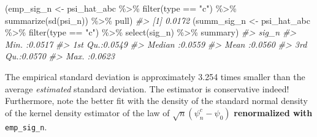 \documentclass[
  11pt,
  openright,twoside]{book}
\newenvironment{Shaded}{\begin{snugshade}}{\end{snugshade}}
\newcommand{\CommentTok}[1]{\textcolor[rgb]{0.56,0.35,0.01}{\textit{#1}}}
\newcommand{\FunctionTok}[1]{\textcolor[rgb]{0.00,0.00,0.00}{#1}}
\newcommand{\NormalTok}[1]{#1}
\newcommand{\OtherTok}[1]{\textcolor[rgb]{0.56,0.35,0.01}{#1}}
\newcommand{\SpecialCharTok}[1]{\textcolor[rgb]{0.00,0.00,0.00}{#1}}
\newcommand{\StringTok}[1]{\textcolor[rgb]{0.31,0.60,0.02}{#1}}
\theoremstyle{definition}
\theoremstyle{definition}
\theoremstyle{definition}
\theoremstyle{definition}
\theoremstyle{remark}
\begin{document}
\begin{Shaded}
\begin{Highlighting}[]
\NormalTok{(emp\_sig\_n }\OtherTok{\textless{}{-}}\NormalTok{ psi\_hat\_abc }\SpecialCharTok{\%\textgreater{}\%} \FunctionTok{filter}\NormalTok{(type }\SpecialCharTok{==} \StringTok{"c"}\NormalTok{) }\SpecialCharTok{\%\textgreater{}\%}
   \FunctionTok{summarize}\NormalTok{(}\FunctionTok{sd}\NormalTok{(psi\_n)) }\SpecialCharTok{\%\textgreater{}\%}\NormalTok{ pull)}
\CommentTok{\#\textgreater{} [1] 0.0172}
\NormalTok{(summ\_sig\_n }\OtherTok{\textless{}{-}}\NormalTok{ psi\_hat\_abc }\SpecialCharTok{\%\textgreater{}\%} \FunctionTok{filter}\NormalTok{(type }\SpecialCharTok{==} \StringTok{"c"}\NormalTok{) }\SpecialCharTok{\%\textgreater{}\%} \FunctionTok{select}\NormalTok{(sig\_n) }\SpecialCharTok{\%\textgreater{}\%}
\NormalTok{   summary)}
\CommentTok{\#\textgreater{}      sig\_n       }
\CommentTok{\#\textgreater{}  Min.   :0.0517  }
\CommentTok{\#\textgreater{}  1st Qu.:0.0549  }
\CommentTok{\#\textgreater{}  Median :0.0559  }
\CommentTok{\#\textgreater{}  Mean   :0.0560  }
\CommentTok{\#\textgreater{}  3rd Qu.:0.0570  }
\CommentTok{\#\textgreater{}  Max.   :0.0623}
\end{Highlighting}
\end{Shaded}

The empirical standard deviation is approximately
3.254 times smaller than the average
\emph{estimated} standard deviation. The estimator is conservative indeed!
Furthermore, note the better fit with the density of the standard normal
density of the kernel density estimator of the law of \(\sqrt{n} (\psi_{n}^{c} - \psi_{0})\) \textbf{renormalized with} \texttt{emp\_sig\_n}.
\end{document}
